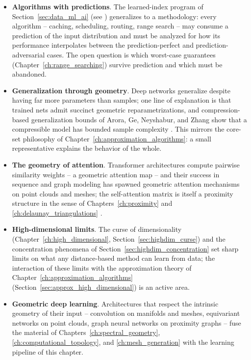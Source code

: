 \begin{itemize}
\item \textbf{Algorithms with predictions}. The learned-index program of
  Section~\ref{sec:data_ml_ai} (see \cite{kraska2018}) generalizes to a
  methodology: every algorithm -- caching, scheduling, routing,
  range search -- may consume a prediction of the input distribution and
  must be analyzed for how its performance interpolates between the
  prediction-perfect and prediction-adversarial cases. The open question is
  which worst-case guarantees (Chapter~\ref{ch:range_searching}) survive
  prediction and which must be abandoned.
\item \textbf{Generalization through geometry}. Deep networks generalize
  despite having far more parameters than samples; one line of explanation
  is that trained nets admit succinct geometric reparametrizations, and
  compression-based generalization bounds of Arora, Ge, Neyshabur, and
  Zhang show that a compressible model has bounded sample complexity
  \cite{arora2018}. This mirrors the core-set philosophy of
  Chapter~\ref{ch:approximation_algorithms}: a small representative
  explains the behavior of the whole.
\item \textbf{The geometry of attention}. Transformer architectures
  compute pairwise similarity weights -- a geometric attention map -- and
  their success in sequence and graph modeling has spawned geometric
  attention mechanisms on point clouds and meshes; the self-attention
  matrix is itself a proximity structure in the sense of
  Chapters~\ref{ch:proximity} and \ref{ch:delaunay_triangulations}
  \cite{vaswani2017}.
\item \textbf{High-dimensional limits}. The curse of dimensionality
  (Chapter~\ref{ch:high_dimensional}, Section~\ref{sec:highdim_curse}) and
  the concentration phenomena of Section~\ref{sec:highdim_concentration}
  set sharp limits on what any distance-based method can learn from data;
  the interaction of these limits with the approximation theory of
  Chapter~\ref{ch:approximation_algorithms}
  (Section~\ref{sec:approx_high_dimensional}) is an active area.
\item \textbf{Geometric deep learning}. Architectures that respect the
  intrinsic geometry of their input -- convolution on manifolds and meshes,
  equivariant networks on point clouds, graph neural networks on proximity
  graphs -- fuse the material of Chapters~\ref{ch:spectral_geometry},
  \ref{ch:computational_topology}, and \ref{ch:mesh_generation} with the
  learning pipeline of this chapter.
\end{itemize}


